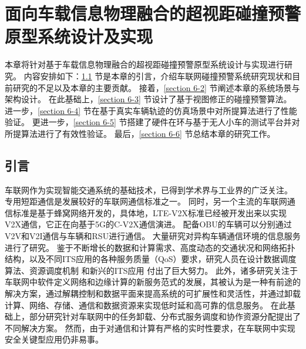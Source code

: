 \chapter{面向车载信息物理融合的超视距碰撞预警原型系统设计及实现}
本章将针对基于车载信息物理融合的超视距碰撞预警原型系统设计与实现进行研究。
内容安排如下：\ref{section 6-1} 节是本章的引言，介绍车联网碰撞预警系统研究现状和目前研究的不足以及本章的主要贡献。
接着，\ref{section 6-2} 节阐述本章的系统场景与架构设计。
在此基础上，\ref{section 6-3} 节设计了基于视图修正的碰撞预警算法。
进一步，\ref{section 6-4} 节在基于真实车辆轨迹的仿真场景中对所提算法进行了性能验证。
更进一步，\ref{section 6-5} 节搭建了硬件在环与基于无人小车的测试平台并对所提算法进行了有效性验证。
最后，\ref{section 6-6} 节总结本章的研究工作。

\section{引言}\label{section 6-1}

车联网作为实现智能交通系统的基础技术，已得到学术界与工业界的广泛关注。
专用短距通信\cite{kenney2011dedicated}是发展较好的车联网通信标准之一。
同时，另一个主流的车联网通信标准是基于蜂窝网络\cite{agiwal2016next}开发的，具体地，LTE-V2X标准已经被开发出来以实现V2X通信，它正在向基于5G的C-V2X通信演进。
配备OBU的车辆可以分别通过V2V和V2I通信与车辆和RSU进行通信。
大量研究\cite{ucar2015multihop, dai2018bandwidth, ahmed2018cooperative}对异构车辆通信环境的信息服务进行了研究。
鉴于不断增长的数据和计算需求\cite{zhai2018optimization}、高度动态的交通状况和网络拓扑结构\cite{zhai2019fast}，以及不同ITS应用的各种服务质量（QoS）要求\cite{babbar2022lbsmt}，研究人员在设计数据调度算法\cite{liu2016cooperative, dai2016adaptive, wang2017dynamic}、资源调度机制 \cite{peng2017resource, ahmed2018secure}和新兴的ITS应用 \cite{liu2013improving, dai2016quality}付出了巨大努力。
此外，诸多研究关注于车联网中软件定义网络\cite{liu2016cooperative, wang2019delay, liu2018coding}和边缘计算\cite{hou2016vehicular, wang2018offloading}的新服务范式的发展，其被认为是一种有前途的解决方案，通过解耦控制和数据平面来提高系统的可扩展性和灵活性，并通过卸载计算、网络、存储、通信和数据资源来实现低时延和高可靠的信息服务。
在此基础上，部分研究针对车联网中的任务卸载\cite{wang2019delay}、分布式服务调度\cite{sun2018cooperative}和协作资源分配\cite{zhou2019computation}提出了不同解决方案。
然而，由于对通信和计算有严格的实时性要求，在车联网中实现安全关键型应用仍非易事。

